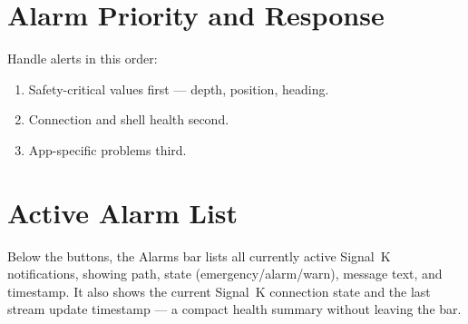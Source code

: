 \section{Alarm Priority and Response}

Handle alerts in this order:

\begin{enumerate}
  \item Safety-critical values first --- depth, position, heading.
  \item Connection and shell health second.
  \item App-specific problems third.
\end{enumerate}

\section{Active Alarm List}

Below the buttons, the Alarms bar lists all currently active Signal~K notifications,
showing path, state (emergency/alarm/warn), message text, and timestamp.
It also shows the current Signal~K connection state and the last stream update
timestamp --- a compact health summary without leaving the bar.
